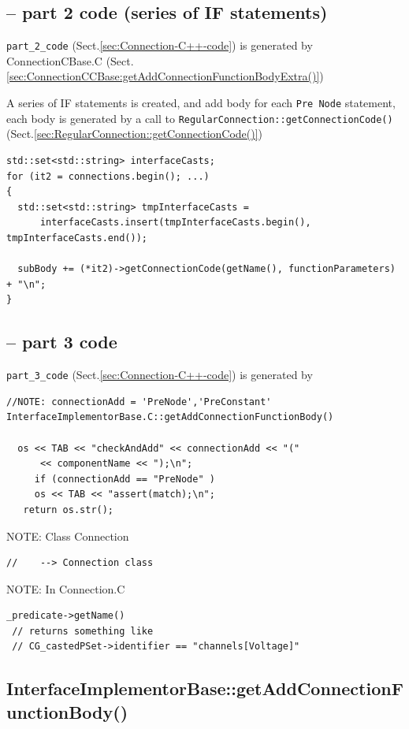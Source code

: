 \subsection{-- part 2 code (series of IF statements)}

\verb!part_2_code!  (Sect.\ref{sec:Connection-C++-code})  is generated  by
ConnectionCBase.C (Sect.\ref{sec:ConnectionCCBase:getAddConnectionFunctionBodyExtra()})

A series of IF statements is created, and add body for each \verb!Pre Node!
statement, each body is generated by a call to 
\verb!RegularConnection::getConnectionCode()!
(Sect.\ref{sec:RegularConnection::getConnectionCode()})

\begin{verbatim}
std::set<std::string> interfaceCasts;
for (it2 = connections.begin(); ...)
{
  std::set<std::string> tmpInterfaceCasts = 
      interfaceCasts.insert(tmpInterfaceCasts.begin(), tmpInterfaceCasts.end());
      
  subBody += (*it2)->getConnectionCode(getName(), functionParameters) + "\n";
}
\end{verbatim}



\subsection{-- part 3 code}

\verb!part_3_code!  (Sect.\ref{sec:Connection-C++-code}) is generated by
\begin{verbatim}
//NOTE: connectionAdd = 'PreNode','PreConstant'
InterfaceImplementorBase.C::getAddConnectionFunctionBody()

  os << TAB << "checkAndAdd" << connectionAdd << "(" 
      << componentName << ");\n";
	 if (connectionAdd == "PreNode" )
   	 os << TAB << "assert(match);\n";
   return os.str();
\end{verbatim}

NOTE: Class Connection
\begin{verbatim}
//    --> Connection class

\end{verbatim}

NOTE: In Connection.C
\begin{verbatim}
_predicate->getName() 
 // returns something like
 // CG_castedPSet->identifier == "channels[Voltage]"
\end{verbatim}

\subsection{InterfaceImplementorBase::getAddConnectionFunctionBody()}
\label{sec:InterfaceImplementorBase::getAddConnectionFunctionBody()}

